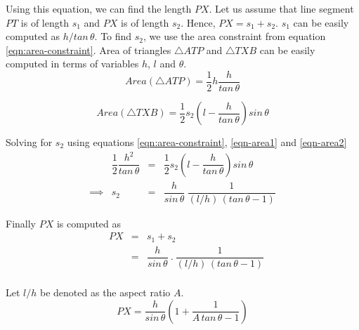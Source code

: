 \documentclass[conf]{new-aiaa}
\begin{document}
Using this equation, we can find the length $PX$. Let us assume that line segment $PT$ is of length $s_1$ and $PX$ is of length $s_2$. Hence, $PX = s_1 + s_2$. $s_1$ can be easily computed as $h/tan \, \theta$. To find $s_2$, we use the area constraint from equation \ref{eqn:area-constraint}. Area of triangles $\bigtriangleup ATP$ and $\bigtriangleup TXB$ can be easily computed in terms of variables $h$, $l$ and $\theta$.
\begin{equation}
    Area(\bigtriangleup ATP) = \dfrac{1}{2} h \dfrac{h}{tan \, \theta}
    \label{eqn-area1}
\end{equation}

\begin{equation}
    Area(\bigtriangleup TXB) = \dfrac{1}{2} s_2 \left(l - \dfrac{h}{tan \, \theta}\right) sin \, \theta
    \label{eqn-area2}    
\end{equation}

Solving for $s_2$ using equations \ref{eqn:area-constraint}, \ref{eqn-area1} and \ref{eqn-area2}
\begin{equation}
\begin{array}{llcl}
     & \dfrac{1}{2} \dfrac{h^2}{tan \, \theta}  & = & \dfrac{1}{2} s_2 \left(l - \dfrac{h}{tan \, \theta} \right) sin \, \theta  \\
    \implies & s_2& = & \dfrac{h}{sin \, \theta} \: \dfrac{1}{ (l/h)\, (tan \, \theta - 1)}
\end{array}
\end{equation}


Finally $PX$ is computed as
\begin{equation}
\begin{array}{llcl}
     & PX & = & s_1 + s_2 \\
    & & = & \dfrac{h}{sin \, \theta} \: . \: \dfrac{1}{ (l/h)\, (tan \, \theta - 1)}\\
\end{array}
\end{equation}

Let $l/h$ be denoted as the aspect ratio $A$.
\begin{equation}
    PX  = \dfrac{h}{sin \, \theta} \left( 1 + \dfrac{1}{A\, tan \, \theta - 1} \right)
\end{equation}
\end{document}
